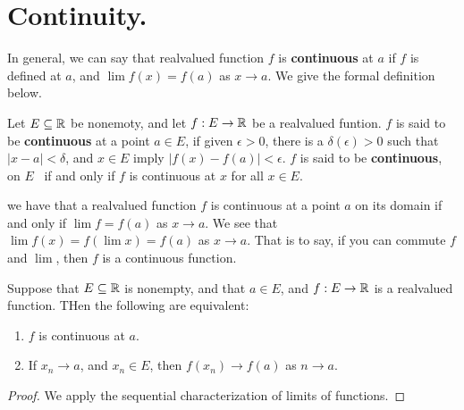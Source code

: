 
\section{Continuity.}

In general, we can say that realvalued function $f$ is \textbf{continuous} at  
$a$ if  $f$ is defined at  $a$, and  $\lim{f(x)}=f(a)$ as  $x \rightarrow a$. We give the 
formal definition below.

\begin{definition}
    Let $E \subseteq \mathbb{R}$ be nonemoty, and let  $f:E \rightarrow \mathbb{R}$ be a realvalued 
    funtion. $f$ is said to be  \textbf{continuous} at a point  $a \in E$, if 
    given  $\epsilon>0$, there is a  $\delta(\epsilon)>0$ such that  $|x-a|<\delta$, 
    and $x \in E$ imply  $|f(x)-f(a)|<\epsilon$. $f$ is said to be \textbf{continuous}, on  $E$ \
    if and only if  $f$ is continuous at  $x$ for all  $x \in E$.
\end{definition}

\begin{remark} 
    we have that a realvalued function $f$ is continuous at a point $a$ on its 
    domain if and only if $\lim{f}=f(a)$ as  $x \rightarrow a$. We see that $\lim{f(x)}=
    f(\lim{x})=f(a)$ as $x \rightarrow a$. That is to say, if you can commute  $f$ and 
     $\lim$, then  $f$ is a continuous function.
\end{remark}

\begin{theorem}\label{3.3.1}
    Suppose that $E \subseteq \mathbb{R}$ is nonempty, and that  $a \in E$, and  $f:E \rightarrow \mathbb{R}$ 
    is a realvalued function. THen the following are equivalent:
         \begin{enumerate}[label=(\arabic*)]
             \item $f$ is continuous at $a$.

             \item If $x_n \rightarrow a$, and $x_n \in E$, then $f(x_n) \rightarrow f(a)$ as $n \rightarrow a$.
        \end{enumerate}
\end{theorem}
\begin{proof}
    We apply the sequential characterization of limits of functions.
\end{proof}

